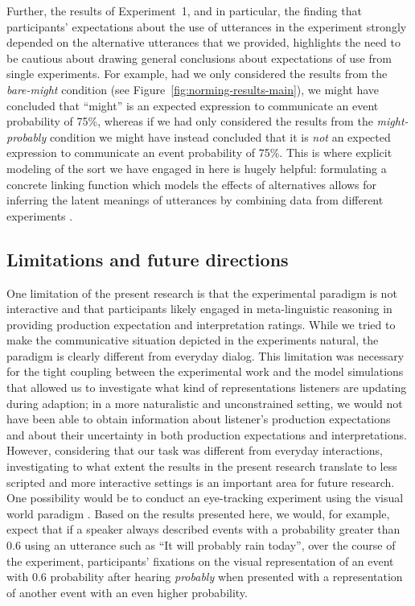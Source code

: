 \documentclass[man, floatsintext]{apa6}
\newcommand{\figref}[1]{Figure~\ref{#1}}
\begin{document}
Further, the results of Experiment~1, and in particular, the finding
that participants' expectations about the use of utterances in the experiment strongly depended on
the alternative utterances that we provided, highlights the need to be cautious about drawing general conclusions about expectations of use from single experiments. For example,
had we only considered the results from the \textit{bare-might} condition (see \figref{fig:norming-results-main}),
we might have concluded that ``might'' is an expected expression to communicate an event probability of 75\%,
whereas if we had only considered the results from the \textit{might-probably} condition we might have instead concluded that it is \emph{not} an expected expression to communicate an event probability of 75\%.
This is where explicit modeling of the sort we have engaged in here is hugely helpful: formulating a concrete linking function which models the effects of 
alternatives allows for inferring the latent meanings of utterances by combining data from different experiments \parencite[see also][for similar approaches]{Franke2014,Peloquin2016}.

\subsection{Limitations and future directions}

One limitation of the present research is that the experimental paradigm is not interactive and that participants likely engaged in meta-linguistic reasoning in providing production expectation and interpretation ratings. While we tried to make the communicative situation depicted in the experiments natural,
the paradigm is clearly different from everyday dialog. This limitation was necessary for the tight coupling between the experimental work
and the model simulations that allowed us to investigate what kind of representations listeners are updating during adaption; in a more
naturalistic and unconstrained setting, we would not have been able to obtain information about listener's production expectations and about their
uncertainty in both production expectations and interpretations. However, considering that our task was different from everyday interactions, investigating
to what extent the results in the present research translate to less scripted and more interactive settings is an important area for future research. 
One possibility would be to conduct an eye-tracking experiment using the visual world paradigm \cite{TanenhausXXXX}. Based on the
results presented here, we would, for example, expect that if a speaker always described events with a probability greater than 0.6 using an utterance
such as ``It will probably rain today'', over the course of the experiment, participants' fixations on the visual representation of an event 
with 0.6 probability after hearing \textit{probably} when presented with a representation of another event with an even higher probability. 
\end{document}
